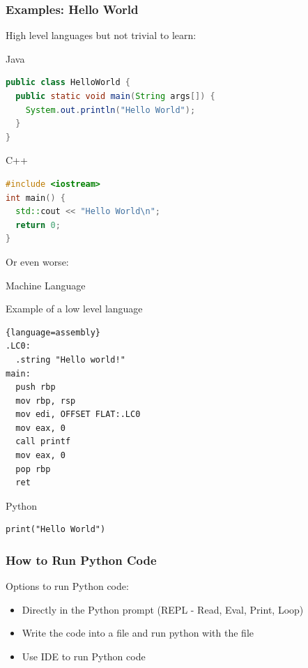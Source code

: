 \documentclass[10pt, a4paper]{beamer} %
\begin{document}
\begin{frame}\frametitle{Examples: Hello World}
High level languages but not trivial to learn:
    \begin{block}{Java}
    {
    \begin{lstlisting}[language=Java]
public class HelloWorld {
  public static void main(String args[]) {
    System.out.println("Hello World");
  }
}
  \end{lstlisting}  
  }
  \end{block}
  
  \begin{block}{C++}
  {
  \begin{lstlisting}[language=C++, morekeywords=include]
#include <iostream>
int main() {
  std::cout << "Hello World\n";
  return 0;
}
  \end{lstlisting}  
  }
  \end{block}
  \framebreak
Or even worse:
  \begin{block}{Machine Language}

  Example of a low level language
\begin{lstlisting}{language=assembly}
.LC0:
  .string "Hello world!"
main:
  push rbp
  mov rbp, rsp
  mov edi, OFFSET FLAT:.LC0
  mov eax, 0
  call printf
  mov eax, 0
  pop rbp
  ret
\end{lstlisting}

\end{block}

  \begin{block}{Python}
    \begin{lstlisting}
print("Hello World")
    \end{lstlisting}
  \end{block}
  
\end{frame}

\begin{frame}[fragile,c]\frametitle{How to Run Python Code}

\begin{block}{Options to run Python code:}
\begin{itemize}
  \item Directly in the Python prompt (REPL - Read, Eval, Print, Loop)
  \item Write the code into a file and run python with the file
  \item Use IDE to run Python code
\end{itemize}
\end{block}
  
\end{frame}
\end{document}
